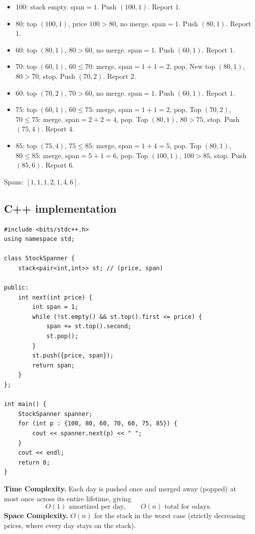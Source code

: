 \begin{itemize}
  \item $100$: stack empty. span$=1$. Push $(100,1)$. Report $1$.
  \item $80$: top $(100,1)$, price $100>80$, no merge. span$=1$. Push
        $(80,1)$. Report $1$.
  \item $60$: top $(80,1)$, $80>60$, no merge. span$=1$. Push $(60,1)$.
        Report $1$.
  \item $70$: top $(60,1)$, $60\le70$: merge, span$=1+1=2$, pop. New top
        $(80,1)$, $80>70$, stop. Push $(70,2)$. Report $2$.
  \item $60$: top $(70,2)$, $70>60$, no merge. span$=1$. Push $(60,1)$.
        Report $1$.
  \item $75$: top $(60,1)$, $60\le75$: merge, span$=1+1=2$, pop. Top
        $(70,2)$, $70\le75$: merge, span$=2+2=4$, pop. Top $(80,1)$,
        $80>75$, stop. Push $(75,4)$. Report $4$.
  \item $85$: top $(75,4)$, $75\le85$: merge, span$=1+4=5$, pop. Top
        $(80,1)$, $80\le85$: merge, span$=5+1=6$, pop. Top $(100,1)$,
        $100>85$, stop. Push $(85,6)$. Report $6$.
\end{itemize}

Spans: $[1,1,1,2,1,4,6]$.

\subsection*{C++ implementation}

\begin{lstlisting}
#include <bits/stdc++.h>
using namespace std;

class StockSpanner {
    stack<pair<int,int>> st; // (price, span)

public:
    int next(int price) {
        int span = 1;
        while (!st.empty() && st.top().first <= price) {
            span += st.top().second;
            st.pop();
        }
        st.push({price, span});
        return span;
    }
};

int main() {
    StockSpanner spanner;
    for (int p : {100, 80, 60, 70, 60, 75, 85}) {
        cout << spanner.next(p) << " ";
    }
    cout << endl;
    return 0;
}
\end{lstlisting}

\begin{complexitybox}
\textbf{Time Complexity.} Each day is pushed once and merged away
(popped) at most once across its entire lifetime, giving
\[
  O(1) \text{ amortized per day}, \qquad O(n) \text{ total for } n \text{
  days}.
\]
\textbf{Space Complexity.} $O(n)$ for the stack in the worst case
(strictly decreasing prices, where every day stays on the stack).
\end{complexitybox}

